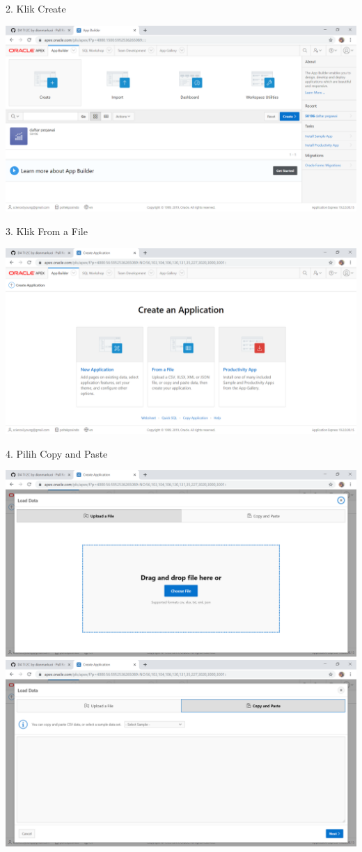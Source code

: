 \documentclass{article}
\begin{document}
    \item 2. Klik Create

\begin{center}
    \includegraphics[width=10cm\textwidth]{figure/2.png}
    \end{center}
    

    \item 3. Klik From a File
\begin{center}
    \includegraphics[width=10cm\textwidth]{figure/3.png}
    \end{center}
    
    
    \item 4. Pilih Copy and Paste
\begin{center}
    \includegraphics[width=10cm\textwidth]{figure/4.png}
    \includegraphics[width=10cm\textwidth]{figure/5.png}
    \end{center}
    
\end{document}

